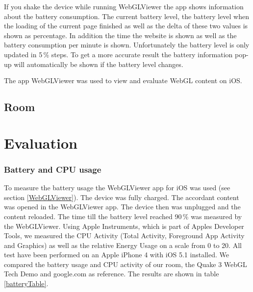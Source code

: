 \documentclass[12pt,journal,compsoc]{IEEEtran}
\begin{document}
	If you shake the device while running WebGLViewer the app shows information about the battery consumption. The current battery level, the battery level when the loading of the current page finished as well as the delta of these two values is shown as percentage. In addition the time the website is shown as well as the battery consumption per minute is shown. Unfortunately the battery level is only updated in 5\,\% steps. To get a more accurate result the battery information pop-up will automatically be shown if the battery level changes.
	
	The app WebGLViewer was used to view and evaluate WebGL content on iOS. 

\subsection{Room}

\section{Evaluation}

\subsubsection{Battery and CPU usage}
To measure the battery usage the WebGLViewer app for iOS was used (see section \ref{WebGLViewer}). The device was fully charged. The accordant content was opened in the WebGLViewer app. The device then was unplugged and the content reloaded. The time till the battery level reached 90\,\% was measured by the WebGLViewer. Using Apple Instruments, which is part of Apples Developer Tools, we measured the CPU Activity (Total Activity, Foreground App Activity and Graphics) as well as the relative Energy Usage on a scale from 0 to 20. All test have been performed on an Apple iPhone 4 with iOS 5.1 installed. We compared the battery usage and CPU activity of our room, the Quake 3 WebGL Tech Demo and google.com as reference. The results are shown in table \ref{batteryTable}. 
\end{document}
